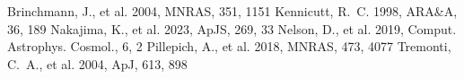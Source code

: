\documentclass[twocolumn]{aastex631}
\begin{document}
\begin{thebibliography}{}
 Brinchmann, J., et al. 2004, MNRAS, 351, 1151
 Kennicutt, R.~C. 1998, ARA\&A, 36, 189
 Nakajima, K., et al. 2023, ApJS, 269, 33
 Nelson, D., et al. 2019, Comput. Astrophys. Cosmol., 6, 2
 Pillepich, A., et al. 2018, MNRAS, 473, 4077
 Tremonti, C.~A., et al. 2004, ApJ, 613, 898
\end{thebibliography}
\end{document}

